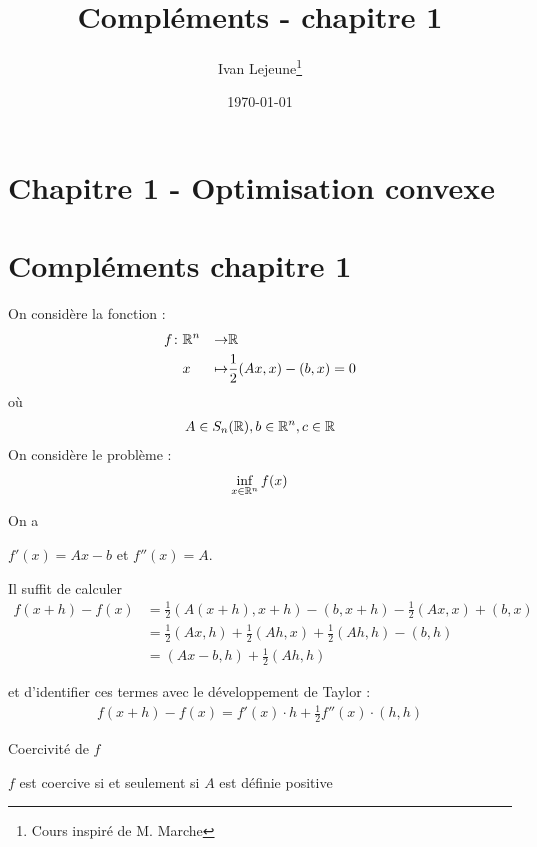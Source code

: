 \documentclass[french,a4paper,10pt]{article}
\title{\color{astral} \sffamily \bfseries Compléments - chapitre 1}
\author{Ivan Lejeune\thanks{Cours inspiré de M. Marche}}
\date{\today}
\begin{document}
	
	\maketitle
	\section{Chapitre 1 - Optimisation convexe}
	\section{Compléments chapitre 1}
	On considère la fonction :
		\[\begin{aligned}
			f\colon &\mathbb{R}^n&\to&\mathbb{R}\\
			&x&\mapsto &\frac 12(Ax,x)-(b,x)=0
		\end{aligned}\]
	où
		\[\begin{aligned}
			A\in S_n(\mathbb{R}),b\in\mathbb{R}^n,c\in\mathbb{R}
		\end{aligned}\]
	On considère le problème :
		\[\begin{aligned}
			\inf_{x\in\mathbb{R}^n}f(x)
		\end{aligned}\]
		
	\begin{oc-proposition}
		On a 
		\begin{center}
			$f'(x)=Ax-b$ et $f''(x)=A$.
		\end{center}
	\end{oc-proposition}
	\begin{myproof}
		Il suffit de calculer
			\[\begin{aligned}
				f(x+h)-f(x)&=\frac12(A(x+h),x+h)-(b,x+h)-\frac12(Ax,x)+(b,x)\\
				&=\frac12(Ax,h)+\frac12(Ah,x)+\frac12(Ah,h)-(b,h)\\
				&=(Ax-b,h)+\frac12(Ah,h)
			\end{aligned}\]
			
		et d'identifier ces termes avec le développement de Taylor :
			\[\begin{aligned}
				f(x+h)-f(x)=f'(x)\cdot h+\frac12 f''(x)\cdot(h,h)
			\end{aligned}\] 
	\end{myproof}
	
	\begin{oc-proposition}
		Coercivité de $f$
		
		$f$ est coercive si et seulement si $A$ est définie positive
	\end{oc-proposition}
	
\end{document}

